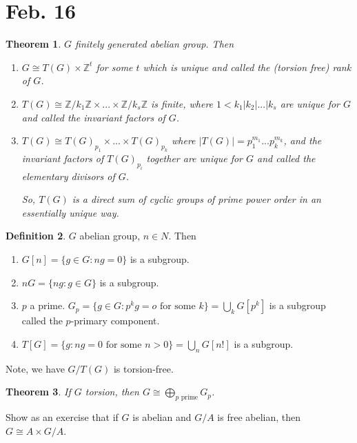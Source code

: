\documentclass{amsart}
\newtheorem{thm}{Theorem}[section]
\theoremstyle{definition}
\newtheorem{definition}[thm]{Definition}
\newcommand{\Z}{\mathbb Z}
\begin{document}
\section{Feb. 16}
\begin{thm}
	$G$ finitely generated abelian group. Then 
	\begin{enumerate}
	\item $G\cong T(G)\times \Z^t$ for some $t$ which is unique and called the (torsion free) rank of $G$.
	\item $T(G)\cong \Z/k_1\Z\times...\times \Z/k_s\Z$ is finite, where $1<k_1|k_2|...|k_s$ are unique for $G$ and called the invariant factors of $G$.
	\item $T(G)\cong T(G)_{p_1}\times ...\times T(G)_{p_k}$ where $|T(G)|=p_1^{m_1}...p_k^{m_k}$, and the invariant factors of $T(G)_{p_i}$ together are unique for $G$ and called the elementary divisors of $G$.
	
	So, $T(G)$ is a direct sum of cyclic groups of prime power order in an essentially unique way.
	\end{enumerate}
\end{thm}
\begin{definition}
	$G$ abelian group, $n\in N$. Then
	\begin{enumerate}
		\item $G[n]=\{g\in G: ng=0\}$ is a subgroup.
		\item $nG=\{ng:g\in G\}$ is a subgroup.
		\item $p$ a prime. $G_p=\{g\in G: p^kg=o\text{ for some }k\}=\bigcup_kG[p^k]$ is a subgroup called the $p$-primary component.
		\item $T[G]=\{g:ng=0\text{ for some } n>0\}=\bigcup_nG[n!]$ is a subgroup.
	\end{enumerate}
\end{definition}
Note, we have $G/T(G)$ is torsion-free.
\begin{thm}
	If $G$ torsion, then $G\cong \bigoplus\limits_{p\text{ prime}}G_p$.
\end{thm}
Show as an exercise that if $G$ is abelian and $G/A$ is free abelian, then $G\cong A\times G/A$.
\end{document}
